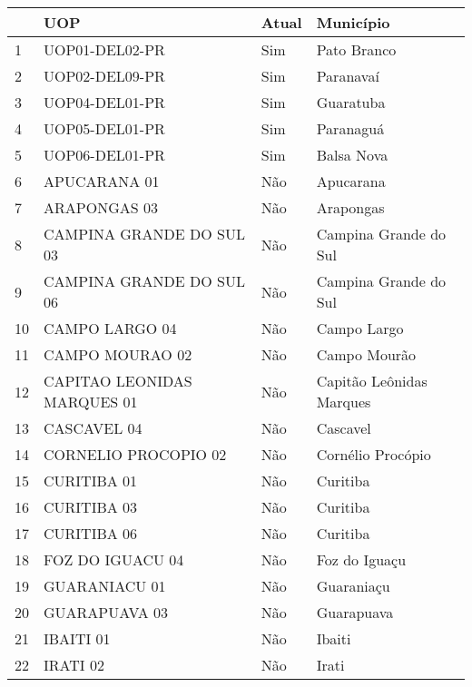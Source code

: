 {\begin{tabular}{l|l|l|l}\hline
   & UOP  & Atual  &  Município \\ \hline\hline
 1 &               UOP01-DEL02-PR &   Sim &               Pato Branco \\
 2 &               UOP02-DEL09-PR &   Sim &                 Paranavaí \\
 3 &               UOP04-DEL01-PR &   Sim &                 Guaratuba \\
 4 &               UOP05-DEL01-PR &   Sim &                 Paranaguá \\
 5 &               UOP06-DEL01-PR &   Sim &                Balsa Nova \\ \hline
 6 &                 APUCARANA 01 &   Não &                 Apucarana \\
 7 &                 ARAPONGAS 03 &   Não &                 Arapongas \\
 8 &     CAMPINA GRANDE DO SUL 03 &   Não &     Campina Grande do Sul \\
 9 &     CAMPINA GRANDE DO SUL 06 &   Não &     Campina Grande do Sul \\
10 &               CAMPO LARGO 04 &   Não &               Campo Largo \\
11 &              CAMPO MOURAO 02 &   Não &              Campo Mourão \\
12 &  CAPITAO LEONIDAS MARQUES 01 &   Não &  Capitão Leônidas Marques \\
13 &                  CASCAVEL 04 &   Não &                  Cascavel \\
14 &         CORNELIO PROCOPIO 02 &   Não &         Cornélio Procópio \\
15 &                  CURITIBA 01 &   Não &                  Curitiba \\
16 &                  CURITIBA 03 &   Não &                  Curitiba \\
17 &                  CURITIBA 06 &   Não &                  Curitiba \\
18 &             FOZ DO IGUACU 04 &   Não &             Foz do Iguaçu \\
19 &                GUARANIACU 01 &   Não &                Guaraniaçu \\
20 &                GUARAPUAVA 03 &   Não &                Guarapuava \\
21 &                    IBAITI 01 &   Não &                    Ibaiti \\
22 &                     IRATI 02 &   Não &                     Irati \\

\end{tabular}}
